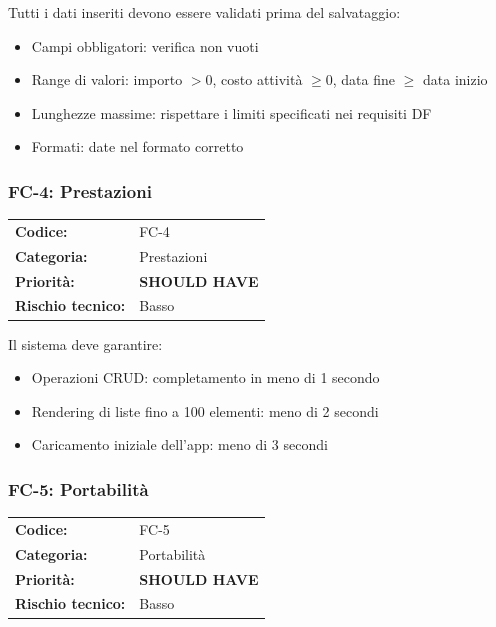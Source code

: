 \documentclass[12pt, a4paper]{article}
\newcommand{\SHOULD}{\colorbox{shouldhave}{\small\textbf{SHOULD HAVE}}}
\newcommand{\RISKL}{\colorbox{risklow}{\small Basso}}
\begin{document}
\medskip
\noindent
Tutti i dati inseriti devono essere validati prima del salvataggio:
\begin{itemize}[leftmargin=1.5em, itemsep=1pt]
  \item Campi obbligatori: verifica non vuoti
  \item Range di valori: importo \(> 0\), costo attività \(\geq 0\), data fine \(\geq\) data inizio
  \item Lunghezze massime: rispettare i limiti specificati nei requisiti DF
  \item Formati: date nel formato corretto
\end{itemize}

\subsubsection{FC-4: Prestazioni}

\begin{tabular}{@{}ll@{}}
  \toprule
  \textbf{Codice:}          & FC-4 \\
  \textbf{Categoria:}       & Prestazioni \\
  \textbf{Priorità:}        & \SHOULD \\
  \textbf{Rischio tecnico:} & \RISKL \\
  \bottomrule
\end{tabular}

\medskip
\noindent
Il sistema deve garantire:
\begin{itemize}[leftmargin=1.5em, itemsep=1pt]
  \item Operazioni CRUD: completamento in meno di 1 secondo
  \item Rendering di liste fino a 100 elementi: meno di 2 secondi
  \item Caricamento iniziale dell'app: meno di 3 secondi
\end{itemize}

\subsubsection{FC-5: Portabilità}

\begin{tabular}{@{}ll@{}}
  \toprule
  \textbf{Codice:}          & FC-5 \\
  \textbf{Categoria:}       & Portabilità \\
  \textbf{Priorità:}        & \SHOULD \\
  \textbf{Rischio tecnico:} & \RISKL \\
  \bottomrule
\end{tabular}
\end{document}
